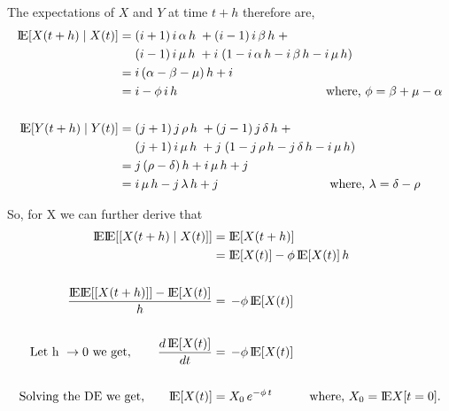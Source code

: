 \documentclass[11pt]{article} %
\newcommand{\expE}{\text{I\kern-0.15em E}}
\begin{document}
The expectations of $X$ and $Y$ at time $t+h$ therefore are,
\begin{align*}
\expE[X(t+h) \;|\; X(t)] = \; &(i+1) \, i \, \alpha \, h \;+ 
(i-1) \, i \, \beta \, h \;+ \\
&(i-1) \, i \, \mu \, h \;+  i \; (1 - i \, \alpha \, h - i \, \beta \, h - i \, \mu \, h) \\
= \; & i \, (\alpha -  \beta - \mu) \, h + i \\
= \; & i -  \phi \, i \, h \qquad \qquad \qquad \qquad \qquad \qquad \text{where, }  \phi = \beta + \mu - \alpha  \\
\\
\expE[Y(t+h) \;|\; Y(t)] = \; &(j+1) \, j \, \rho \, h \;+ 
(j-1) \, j \, \delta \, h \;+ \\
&(j+1) \, i \, \mu \, h \;+  j \; (1 - j \, \rho \, h - j \, \delta \, h - i \, \mu \, h) \\
= \; & j \, (\rho - \delta) \, h + i \, \mu \, h + j \\
= \; & i \, \mu \, h - j \, \lambda \, h + j \qquad \qquad \qquad \qquad \quad \text{where, }  \lambda = \delta - \rho 
\end{align*}

\vspace{5mm}

So, for X we can further derive that 
\begin{eqnarray}
\begin{aligned}
    \expE\expE[[X(t+h) \;|\; X(t)]] &=  \expE[X(t+h)] \\
    &= \expE[X(t)] - \phi \, \expE[X(t)]\, h \\
    \\
    \frac{\expE\expE[[X(t+h)]] - \expE[X(t)]}{h} &= \, - \phi \, \expE[X(t)] \\
    \\
    \text{Let h } \rightarrow 0 \text{ we get}, \qquad \frac{d\, \expE[X(t)]}{dt} &= \, - \phi \,  \expE[X(t)] \\
    \\
    \text{Solving the DE we get,} \qquad \expE[X(t)] &= X_0 \, e^{-\phi \, t} \qquad \quad \text{where, } X_0 = \expE{X[t=0]}. 
\end{aligned}
\label{eq:firstDE}
\end{eqnarray}
\end{document}
